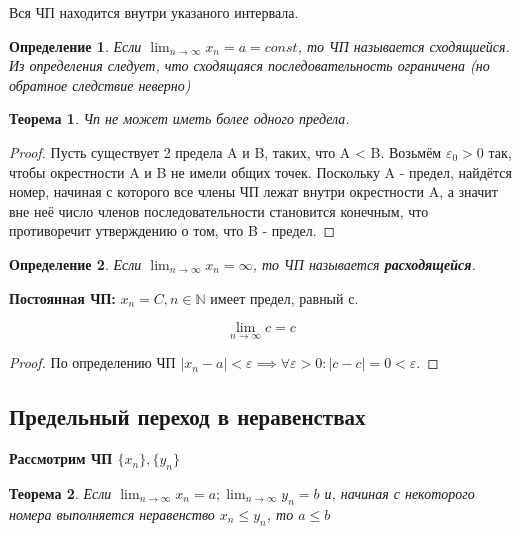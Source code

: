 \documentclass[12pt, a4paper]{article}
\newtheorem{theorem}{Теорема}[subsection]
\newtheorem{definition}{Определение}[subsection]
\theoremstyle{remark}
\newcommand{\N}{\mathbb{N}}
\newcommand{\Y}{\mathbb{\forall}}
\newcommand{\E}{\mathbb{\varepsilon}}
\begin{document}
	Вся ЧП находится внутри указаного интервала.
	\begin{definition}
		Если $\lim_{n \to \infty} x_n = a = const$, то ЧП называется сходящиейся. Из определения следует, что сходящаяся последовательность ограничена (но обратное следствие неверно)
	\end{definition}
	
	\begin{theorem}
		Чп не может иметь более одного предела.
	\end{theorem}
	
	\begin{proof}
		Пусть существует 2 предела A и B, таких, что A < B. Возьмём $\E_0 > 0$ так, чтобы окрестности A и B не имели общих точек. Поскольку A - предел, найдётся номер, начиная с которого все члены ЧП лежат внутри окрестности A, а значит вне неё число членов последовательности становится конечным, что противоречит утверждению о том, что B - предел.
	\end{proof}
	
	\begin{definition}
		Если $\lim_{n \to \infty} x_n = \infty$, то ЧП называется \textbf{расходящейся}.
	\end{definition}
	
	\textbf{Постоянная ЧП:} $x_n = C, n \in \N$ имеет предел, равный с.
	
	\[
	\lim_{n \to \infty} c = c
	\]
	
	\begin{proof}
		По определению ЧП $|x_n - a| < \E \implies \Y\E > 0: |c - c| = 0 < \E$.
	\end{proof}
	
	\subsection{Предельный переход в неравенствах}
	
	\textbf{Рассмотрим ЧП $\{x_n\}, \{y_n\}$}
	
	\begin{theorem}
		Если $\lim_{n \to \infty} x_n = a; \lim_{n \to \infty} y_n = b$ и, начиная с некоторого номера выполняется неравенство $x_n \leq y_n$, то $a \leq b$
	\end{theorem}
	
\end{document}
